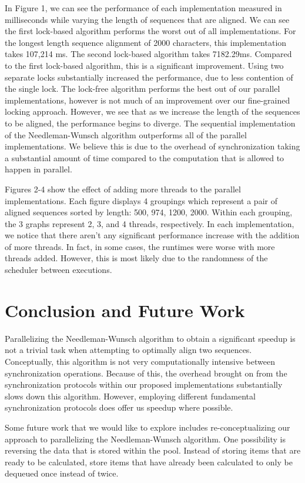 \documentclass[letterpaper, 10 pt, conference]{IEEEconf}
\begin{document}
In Figure 1, we can see the performance of each implementation measured in milliseconds while varying the length of sequences that are aligned. We can see the first lock-based algorithm performs the worst out of all implementations. For the longest length sequence alignment of 2000 characters, this implementation takes 107,214 ms. The second lock-based algorithm takes 7182.29ms. Compared to the first lock-based algorithm, this is a significant improvement. Using two separate locks substantially increased the performance, due to less contention of the single lock. The lock-free algorithm performs the best out of our parallel implementations, however is not much of an improvement over our fine-grained locking approach. However, we see that as we increase the length of the sequences to be aligned, the performance begins to diverge. The sequential implementation of the Needleman-Wunsch algorithm outperforms all of the parallel implementations. We believe this is due to the overhead of synchronization taking a substantial amount of time compared to the computation that is allowed to happen in parallel. 

Figures 2-4 show the effect of adding more threads to the parallel implementations. Each figure displays 4 groupings which represent a pair of aligned sequences sorted by length: 500, 974, 1200, 2000. Within each grouping, the 3 graphs represent 2, 3, and 4 threads, respectively. In each implementation, we notice that there aren't any significant performance increase with the addition of more threads. In fact, in some cases, the runtimes were worse with more threads added. However, this is most likely due to the randomness of the scheduler between executions. 

\section{Conclusion and Future Work}
Parallelizing the Needleman-Wunsch algorithm to obtain a significant speedup is not a trivial task when attempting to optimally align two sequences. Conceptually, this algorithm is not very computationally intensive between synchronization operations. Because of this, the overhead brought on from the synchronization protocols within our proposed implementations substantially slows down this algorithm. However, employing different fundamental synchronization protocols does offer us speedup where possible. 

Some future work that we would like to explore includes re-conceptualizing our approach to parallelizing the Needleman-Wunsch algorithm. One possibility is reversing the data that is stored within the pool. Instead of storing items that are ready to be calculated, store items that have already been calculated to only be dequeued once instead of twice. 
\end{document}
